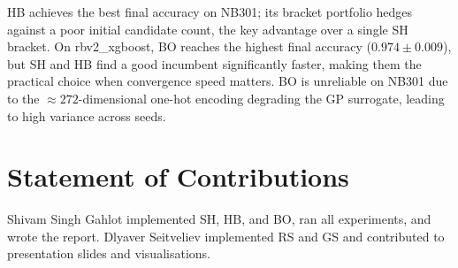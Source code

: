 \documentclass{AIM_report}
\begin{document}
HB achieves the best final accuracy on NB301; its bracket portfolio
hedges against a poor initial candidate count, the key advantage over
a single SH bracket.
On rbv2\_xgboost, BO reaches the highest final accuracy
($0.974{\pm}0.009$), but SH and HB find a good incumbent significantly
faster, making them the practical choice when convergence speed matters.
BO is unreliable on NB301 due to the ${\approx}272$-dimensional one-hot
encoding degrading the GP surrogate, leading to high variance across seeds.

\section*{Statement of Contributions}

Shivam Singh Gahlot implemented SH, HB, and BO, ran all experiments, and
wrote the report.
Dlyaver Seitveliev implemented RS and GS and contributed to presentation
slides and visualisations.



\end{document}
